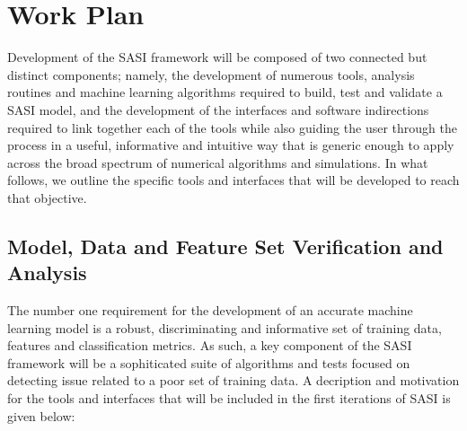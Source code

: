 \section{Work Plan} 
\label{sec:approach}


Development of the SASI framework will be composed of two connected but distinct components; namely, the development of numerous tools, analysis routines and machine learning algorithms required to build, test and validate a SASI model, and the development of the interfaces and software indirections required to link together each of the tools while also guiding the user through the process in a useful, informative and intuitive way that is generic enough to apply across the broad spectrum of numerical algorithms and simulations. In what follows, we outline the specific tools and interfaces that will be developed to reach that objective. 

\subsection{ Model, Data and Feature Set Verification and Analysis }

The number one requirement for the development of an accurate machine learning model is a robust, discriminating and informative set of training data, features and classification metrics. As such, a key component of the SASI framework will be a sophiticated suite of algorithms and tests focused on detecting issue related to a poor set of training data. A decription and motivation for the tools and interfaces that will be included in the first iterations of SASI is given below: 

